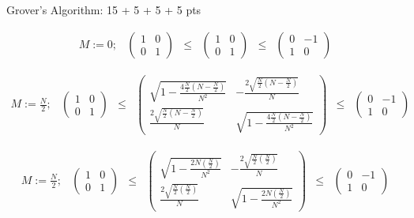 \documentclass[12pt]{article}
\makeatletter
\newcommand{\<}{\langle}
\renewcommand{\>}{\rangle}
\newenvironment{problem}{\@startsection
       {section}
       {1}
       {-.2em}
       {-3.5ex plus -1ex minus -.2ex}
       {2.3ex plus .2ex}
       {\pagebreak[3]
       \large\bf\noindent{Problem }
       }
       }
       {%
       \begin{center}\large\bf \end{center}}
\makeatother
\begin{document}
\begin{problem}{Grover's Algorithm: 15 + 5 + 5 + 5 pts}
\begin{enumerate}
$$
\begin{array}{cccccc} M := 0;&
\left(\begin{array}{cc}
		1 & 0\\
		0 & 1		
		\end{array}
      \right) 
      &\leq& 
\left(\begin{array}{cc}
	1 & 0\\
	0 & 1
\end{array}\right) 
	 &\leq&
\left(\begin{array}{cc}
		0 & -1\\
		1 & 0
		\end{array}
      \right)
\end{array}
$$

$$
\begin{array}{cccccc}M := \frac{N}{2};&
\left(\begin{array}{cc}
		1 & 0\\
		0 & 1		
		\end{array}
      \right) 
      &\leq& 
\left(\begin{array}{cc}
	\sqrt{1 - \frac{4\frac{N}{2}(N-\frac{N}{2})}{N^2}} & -\frac{2\sqrt{\frac{N}{2}(N-\frac{N}{2})}}{N}\\
	\frac{2\sqrt{\frac{N}{2}(N-\frac{N}{2})}}{N} & \sqrt{1 - \frac{4\frac{N}{2}(N-\frac{N}{2})}{N^2}}
\end{array}\right) 
	 &\leq&
\left(\begin{array}{cc}
		0 & -1\\
		1 & 0
		\end{array}
      \right)
\end{array}
$$

$$
\begin{array}{cccccc}M := \frac{N}{2};&
\left(\begin{array}{cc}
		1 & 0\\
		0 & 1		
		\end{array}
      \right) 
      &\leq& 
\left(\begin{array}{cc}
	\sqrt{1 - \frac{2N(\frac{N}{2})}{N^2}} & -\frac{2\sqrt{\frac{N}{2}(\frac{N}{2})}}{N}\\
	\frac{2\sqrt{\frac{N}{2}(\frac{N}{2})}}{N} & \sqrt{1 - \frac{2N(\frac{N}{2})}{N^2}}
\end{array}\right) 
	 &\leq&
\left(\begin{array}{cc}
		0 & -1\\
		1 & 0
		\end{array}
      \right)
\end{array}
$$


\end{enumerate}
\end{problem}
\end{document}
